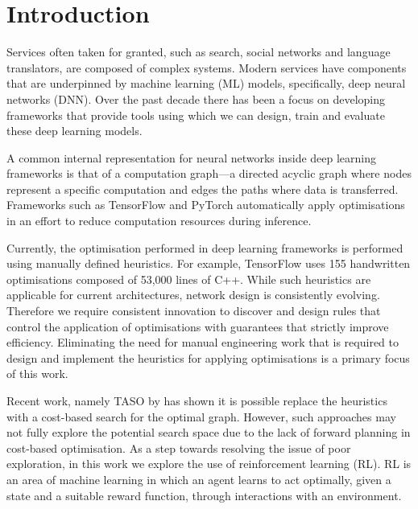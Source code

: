 \chapter{Introduction}

Services often taken for granted, such as search, social networks and language translators, are composed of complex systems. Modern services have components that are underpinned by machine learning (ML) models, specifically, deep neural networks (DNN). Over the past decade there has been a focus on developing frameworks that provide tools using which we can design, train and evaluate these deep learning models.

A common internal representation for neural networks inside deep learning frameworks is that of a computation graph---a directed acyclic graph where nodes represent a specific computation and edges the paths where data is transferred. Frameworks such as TensorFlow \cite{tensorflow2015-whitepaper} and PyTorch \cite{pytorch} automatically apply optimisations in an effort to reduce computation resources during inference.

Currently, the optimisation performed in deep learning frameworks is performed using manually defined heuristics. For example, TensorFlow \cite{tensorflow2015-whitepaper} uses 155 handwritten optimisations composed of 53,000 lines of C++. While such heuristics are applicable for current architectures, network design is consistently evolving. Therefore we require consistent innovation to discover and design rules that control the application of optimisations with guarantees that strictly improve efficiency. Eliminating the need for manual engineering work that is required to design and implement the heuristics for applying optimisations is a primary focus of this work.

Recent work, namely TASO by \citet{jia2019taso,jia2019optimizing} has shown it is possible replace the heuristics with a cost-based search for the optimal graph. However, such approaches may not fully explore the potential search space due to the lack of forward planning in cost-based optimisation. As a step towards resolving the issue of poor exploration, in this work we explore the use of reinforcement learning (RL). RL is an area of machine learning in which an agent learns to act optimally, given a state and a suitable reward function, through interactions with an environment.


